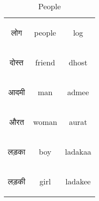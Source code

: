 \begin{table}[H]
    \centering
    \begin{tabular}{c|c|c}
        \begin{hindi} लोग \end{hindi} & people & log \\
        \begin{hindi} दोस्त \end{hindi} & friend & dhost\\
        \begin{hindi} आदमी \end{hindi} & man & admee\\
        \begin{hindi} औरत \end{hindi} & woman & aurat\\
        \begin{hindi} लड़का \end{hindi} & boy & ladakaa\\
        \begin{hindi} लड़की \end{hindi} & girl & ladakee\\
    \end{tabular}
    \caption{People}
    \label{tab:nouns_people}
\end{table}


